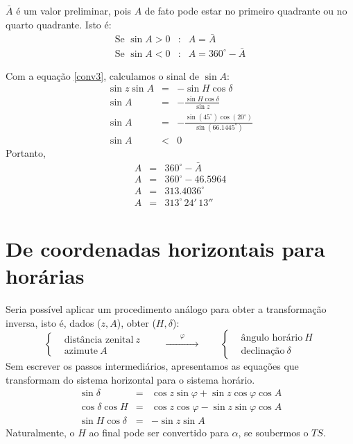 \begin{exemplo}{9}
$\bar{A}$ é um valor preliminar, pois $A$ de fato pode estar no primeiro quadrante ou no quarto quadrante. Isto é:
%
\begin{eqnarray*}
\text{Se~} \sin A > 0 &:& A = \bar{A} \\
\text{Se~} \sin A < 0 &:& A = 360^{\circ} - \bar{A}
\end{eqnarray*}

Com a equação \ref{conv3}, calculamos o sinal de  $\sin A$:
%
\begin{eqnarray*} 
\sin z \sin A &=& -\sin H \cos \delta \\
\sin A &=& -\frac{\sin H \cos \delta}{\sin z}\\
\sin A &=& -\frac{\sin(45^{\circ}) \cos(20^{\circ})}{\sin(66.1445^{\circ})}\\
\sin A &<& 0
\end{eqnarray*} 
%
Portanto,
\begin{eqnarray*} 
A &=& 360^{\circ} - \bar{A} \\
A &=& 360^{\circ} - 46.5964 \\
A &=& 313.4036^{\circ} \\
A &=& 313^{\circ}\,24'\,13''
\end{eqnarray*} 

\end{exemplo}


\section{De coordenadas horizontais para horárias}

Seria possível aplicar um procedimento análogo para obter a transformação inversa, isto é, dados ($z, A$), obter ($H, \delta$):
%
\begin{equation*}
\left\{
\begin{aligned}
& \text{distância zenital}~z\\
& \text{azimute}~A
\end{aligned}
\right.
\qquad \xrightarrow[\hspace{2cm}]{\varphi} \qquad
\left\{
\begin{aligned}
& \text{ângulo horário}~H\\
& \text{declinação}~\delta
\end{aligned}
\right.
\end{equation*}
%
Sem escrever os passos intermediários, apresentamos as equações que transformam do sistema horizontal para o sistema horário. 
%
\begin{eqnarray}
\sin \delta &=& \cos z \sin \varphi + \sin z \cos \varphi \cos A \label{inv1} \\
\cos \delta \cos H &=& \cos z \cos \varphi - \sin z \sin \varphi \cos A \label{inv2} \\
\sin H \cos \delta &=& -\sin z \sin A \label{inv3}
\end{eqnarray}
%
Naturalmente, o $H$ ao final pode ser convertido para $\alpha$, se soubermos o $TS$.


